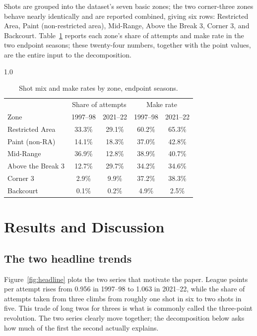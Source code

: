 \documentclass[12pt]{article}
\begin{document}
Shots are grouped into the dataset's seven basic zones; the two corner-three
zones behave nearly identically and are reported combined, giving six rows:
Restricted Area, Paint (non-restricted area), Mid-Range, Above the Break 3,
Corner 3, and Backcourt. Table~\ref{tab:endpoints} reports each zone's share
of attempts and make rate in the two endpoint seasons; these twenty-four
numbers, together with the point values, are the entire input to the
decomposition.

\begin{table}[ht]
\begin{spacing}{1.0}
\centering
\caption{Shot mix and make rates by zone, endpoint seasons.}
\label{tab:endpoints}
\begin{tabular}{lcccc}
\toprule
 & \multicolumn{2}{c}{Share of attempts} & \multicolumn{2}{c}{Make rate} \\
Zone & 1997--98 & 2021--22 & 1997--98 & 2021--22 \\
\midrule
Restricted Area   & 33.3\% & 29.1\% & 60.2\% & 65.3\% \\
Paint (non-RA)    & 14.1\% & 18.3\% & 37.0\% & 42.8\% \\
Mid-Range         & 36.9\% & 12.8\% & 38.9\% & 40.7\% \\
Above the Break 3 & 12.7\% & 29.7\% & 34.2\% & 34.6\% \\
Corner 3          &  2.9\% &  9.9\% & 37.2\% & 38.3\% \\
Backcourt         &  0.1\% &  0.2\% &  4.9\% &  2.5\% \\
\bottomrule
\end{tabular}
\end{spacing}
\end{table}

\section{Results and Discussion}

\subsection{The two headline trends}

Figure~\ref{fig:headline} plots the two series that motivate the paper.
League points per attempt rises from 0.956 in 1997--98 to 1.063 in 2021--22,
while the share of attempts taken from three climbs from roughly one shot in
six to two shots in five. This trade of long twos for threes is what is
commonly called the three-point revolution. The two series clearly move
together; the decomposition below asks how much of the first the second
actually explains.
\end{document}
